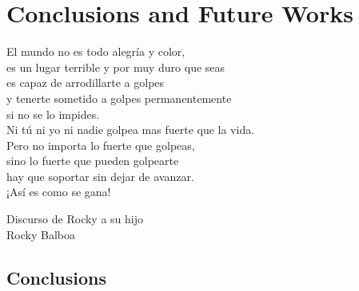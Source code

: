 % 
% 
% 
% 
% 
% 
% 

\chapter{Conclusions and Future Works}
\label{cha:conclusions_and_future_works}

\begin{FraseCelebre}
	\begin{Frase}
		El mundo no es todo alegría y color, \\
		es un lugar terrible y por muy duro que seas \\
		es capaz de arrodillarte a golpes \\
		y tenerte sometido a golpes permanentemente \\
		si no se lo impides. \\
		Ni tú ni yo ni nadie golpea mas fuerte que la vida. \\
		Pero no importa lo fuerte que golpeas, \\
		sino lo fuerte que pueden golpearte \\
		hay que soportar sin dejar de avanzar. \\
		¡Así es como se gana!
	\end{Frase}
	\begin{Fuente}
		Discurso de Rocky a su hijo \\
		Rocky Balboa
	\end{Fuente}
\end{FraseCelebre}

\section{Conclusions}
\label{sec:9_conclusions}

